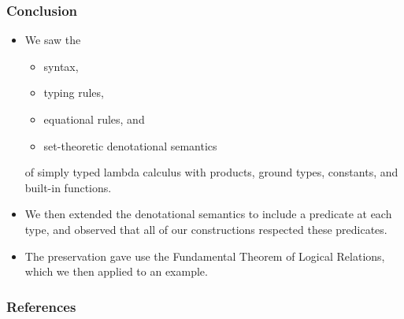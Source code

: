 \documentclass[aspectratio=169]{beamer}
\begin{document}
\begin{frame}
\frametitle{Conclusion}

\begin{itemize}
    \item We saw the
    \begin{itemize}
        \item syntax,
        \item typing rules,
        \item equational rules, and
        \item set-theoretic denotational semantics
    \end{itemize}
     of simply typed lambda calculus with products, ground types, constants, and built-in functions.
    \item We then extended the denotational semantics to include a predicate at each type, and observed that all of our constructions respected these predicates.
    \item The preservation gave use the Fundamental Theorem of Logical Relations, which we then applied to an example.
\end{itemize}
\end{frame}

\begin{frame}
\frametitle{References}

\printbibliography
\end{frame}
\end{document}
